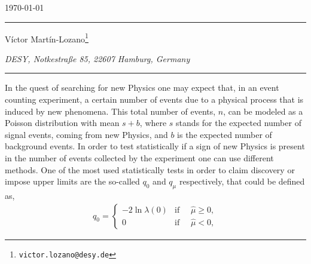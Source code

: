 \documentclass[12pt,a4paper]{article}
\renewcommand{\thefootnote}{\fnsymbol{footnote}}
\renewcommand{\thefootnote}{\arabic{footnote}}
\begin{document}
\renewcommand{\tablename}{\footnotesize \sffamily \textbf{Table}} 
\renewcommand{\figurename}{\footnotesize \sffamily \textbf{Figure}}

\def\thefootnote{\fnsymbol{footnote}}

\begin{flushright}
  \textsf{\today}
\end{flushright}

 \vspace{1cm}
\begin{center}
  {}
\end{center}


\begin{center}
{\color{desycyan}
\rule[0mm]{100mm}{0.5mm}}
\end{center}

\begin{center}{{\large
V\'ictor Mart\'in-Lozano\footnote{\tt victor.lozano@desy.de}} %


\textit{DESY,  Notkestra{\ss}e  85,  22607  Hamburg, Germany}
} %
\end{center}



\begin{center}
{\color{desycyan}
\rule[0mm]{100mm}{0.5mm}}
\end{center}
\vspace{1.5cm}
\renewcommand{\thefootnote}{\arabic{footnote}}
\setcounter{footnote}{0}

In the quest of searching for new Physics one may expect that, in an event counting experiment, a certain number of events due to a physical process that is induced by new phenomena. This total number of events, $n$, can be modeled as a Poisson distribution with mean $s+b$, where $s$ stands for the expected number of signal events, coming from new Physics, and $b$ is the expected number of background events. In order to test statistically if a sign of new Physics is present in the number of events collected by the experiment one can use different methods. One of the most used statistically tests in order to claim discovery or impose upper limits are the so-called $q_0$ and $q_\mu$ respectively, that could be defined as,
\begin{align}
 q_0 = \left \{ 
 \begin{matrix} 
 -2\ln \lambda (0) & \mbox{if }\quad\hat{\mu}\geq 0,\\ 0 & \mbox{if }\quad\hat{\mu}< 0,\end{matrix}\right.\label{eq_q0test}
\end{align}
\end{document}
